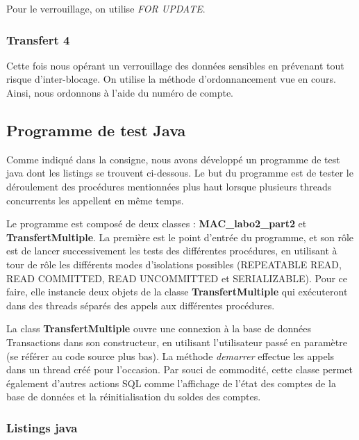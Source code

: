 \documentclass[11pt, a4paper, french, twoside]{article}
\begin{document}
    Pour le verrouillage, on utilise \textit{FOR UPDATE}.
    
    

    \subsubsection{Transfert 4}
    Cette fois nous opérant un verrouillage des données sensibles en prévenant tout risque d'inter-blocage. On utilise la méthode d'ordonnancement vue en cours. Ainsi, nous ordonnons à l'aide du numéro de compte.

    

    \subsection{Programme de test Java}
    Comme indiqué dans la consigne, nous avons développé un programme de test java dont les listings se trouvent ci-dessous. Le but du programme est de tester le déroulement des procédures mentionnées plus haut lorsque plusieurs threads concurrents les appellent en même temps.
    
    Le programme est composé de deux classes : \textbf{MAC\_labo2\_part2} et \textbf{TransfertMultiple}. La première est le point d'entrée du programme, et son rôle est de lancer successivement les tests des différentes procédures, en utilisant à tour de rôle les différents modes d'isolations possibles (REPEATABLE READ, READ COMMITTED, READ UNCOMMITTED et SERIALIZABLE). Pour ce faire, elle instancie deux objets de la classe \textbf{TransfertMultiple} qui exécuteront dans des threads séparés des appels aux différentes procédures. 
    
    La class \textbf{TransfertMultiple} ouvre une connexion à la base de données Transactions dans son constructeur, en utilisant l'utilisateur passé en paramètre (se référer au code source plus bas). La méthode \textit{demarrer} effectue les appels dans un thread créé pour l'occasion. Par souci de commodité, cette classe permet également d'autres actions SQL comme l'affichage de l'état des comptes de la base de données et la réinitialisation du soldes des comptes. 
    
    \subsubsection{Listings java}
    
    
\end{document}

